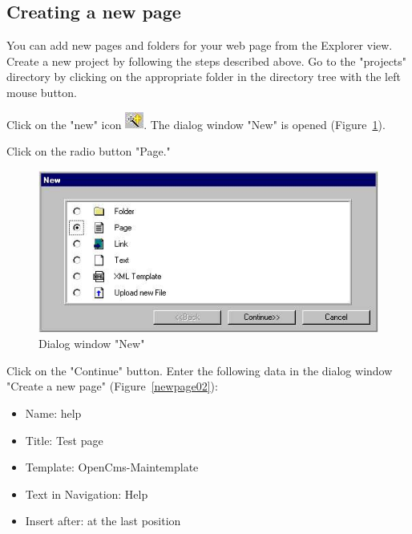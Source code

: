 \subsection{Creating a new page}

You can add new pages and folders for your web page from the
Explorer view. Create a new project by following the steps
described above. Go to the "projects" directory by clicking on the
appropriate folder in the directory tree with the left mouse
button.

Click on the "new" icon
\includegraphics{pics/usermanual/ic_newres}. The dialog window
"New" is opened (Figure~\ref{newpage01}).

Click on the radio button "Page."

\begin{figure}[hbt]
\begin{center}
\includegraphics[width=\sgw]
                   {pics/usermanual/newPage01}
\caption[Dialog window "New"]
           {Dialog window "New"}
\label{newpage01}
\end{center}
\end{figure}

Click on the "Continue" button. Enter the following data in the
dialog window "Create a new page" (Figure~\ref{newpage02}):

\begin{itemize}
\item Name: help
\item Title: Test page
\item Template: OpenCms-Maintemplate
\item Text in Navigation: Help
\item Insert after: at the last position
\end{itemize}

